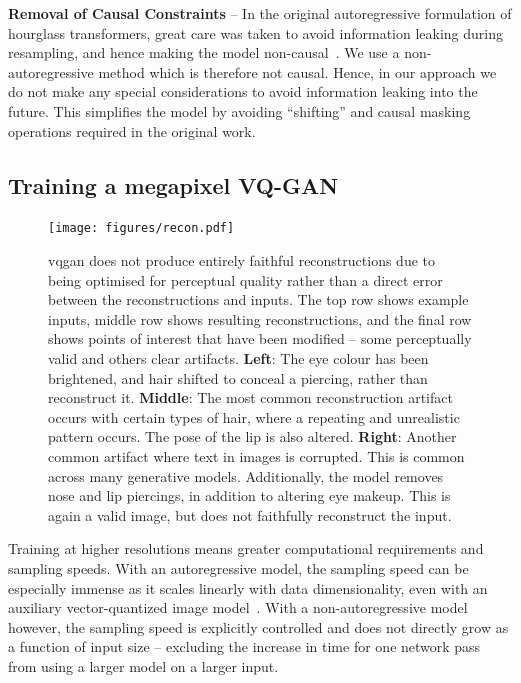 \textbf{Removal of Causal Constraints} -- In the original autoregressive
formulation of hourglass transformers, great care was taken to avoid information
leaking during resampling, and hence making the model
non-causal~\cite{nawrot2021hierarchical}. We use a non-autoregressive method
which is therefore not causal. Hence, in our approach we do not make any special
considerations to avoid information leaking into the future. This simplifies the
model by avoiding ``shifting'' and causal masking operations required in the original work.

\subsection{Training a megapixel VQ-GAN}
\label{subsec:megagan}

\begin{figure}[ht]
    \centering
    \texttt{[image: figures/recon.pdf]}
    \caption{
        \gls{vqgan} does not produce entirely faithful reconstructions due to
        being optimised for perceptual quality rather than a direct error between
        the reconstructions and inputs. The top row shows example inputs, middle row
        shows resulting reconstructions, and the final row shows points of interest that
        have been modified -- some perceptually valid and others clear
        artifacts. 
        \textbf{Left}: The eye colour has been brightened, and hair
        shifted to conceal a piercing, rather than reconstruct it.
        \textbf{Middle}: The most common reconstruction artifact occurs with
        certain types of hair, where a repeating and unrealistic pattern occurs. The
        pose of the lip is also altered. 
        \textbf{Right}: Another common artifact where text in images is
        corrupted. This is common across many generative models. Additionally,
        the model removes nose and lip piercings, in addition to altering eye
        makeup. This is again a valid image, but does not faithfully reconstruct
        the input.}
    \label{fig:recon}
\end{figure}

Training at higher resolutions means greater computational requirements and
sampling speeds. With an autoregressive model, the sampling speed can be
especially immense as it scales linearly with data dimensionality, even with an
auxiliary vector-quantized image model~\cite{esser2021taming}. With a
non-autoregressive model however, the sampling speed is explicitly controlled
and does not directly grow as a function of input size -- excluding the
increase in time for one network pass from using a larger model on a larger input.

